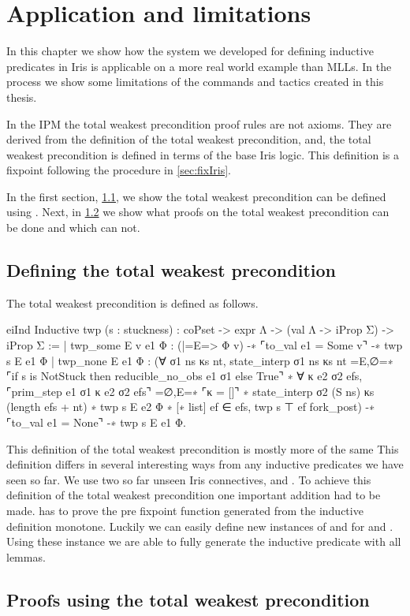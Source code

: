 \documentclass[thesis.tex]{subfiles}
\begin{document}
\VerbatimFootnotes

\chapter{Application and limitations}\label{ch:application}
In this chapter we show how the system we developed for defining inductive predicates in Iris is applicable on a more real world example than MLLs. In the process we show some limitations of the commands and tactics created in this thesis.

In the IPM the total weakest precondition proof rules are not axioms. They are derived from the definition of the total weakest precondition, and, the total weakest precondition is defined in terms of the base Iris logic. This definition is a fixpoint following the procedure in \cref{sec:fixIris}.

In the first section, \cref{sec:deftwp}, we show the total weakest precondition can be defined using . Next, in \cref{sec:prooftwp} we show what proofs on the total weakest precondition can be done and which can not.

\section{Defining the total weakest precondition}\label{sec:deftwp}
The total weakest precondition is defined as follows.
\begin{coqcode}
  eiInd
  Inductive twp (s : stuckness) : 
      coPset -> expr Λ -> 
      (val Λ -> iProp Σ) -> iProp Σ :=
    | twp_some E v e1 Φ : 
      (|={E}=> Φ v) -∗ 
      ⌜to_val e1 = Some v⌝ -∗ 
      twp s E e1 Φ
    | twp_none E e1 Φ : 
      (∀ σ1 ns κs nt,
         state_interp σ1 ns κs nt ={E,∅}=∗
         ⌜if s is NotStuck then reducible_no_obs e1 σ1 
                           else True⌝ ∗
         ∀ κ e2 σ2 efs, 
           ⌜prim_step e1 σ1 κ e2 σ2 efs⌝ ={∅,E}=∗
           ⌜κ = []⌝ ∗
           state_interp σ2 (S ns) κs (length efs + nt) ∗
           twp s E e2 Φ ∗
           [∗ list] ef ∈ efs, twp s ⊤ ef fork_post) 
      -∗ ⌜to_val e1 = None⌝ 
      -∗ twp s E e1 Φ.
\end{coqcode}
This definition of the total weakest precondition is mostly more of the same
This definition differs in several interesting ways from any inductive predicates we have seen so far. We use two so far unseen Iris connectives,  and \coqi{[_ list]}.
To achieve this definition of the total weakest precondition one important addition had to be made.  has to prove the pre fixpoint function generated from the inductive definition monotone. Luckily we can easily define new instances of  and  for  and \coqi{[_ list]}. Using these instance we are able to fully generate the inductive predicate with all lemmas.

\section{Proofs using the total weakest precondition}\label{sec:prooftwp}
\end{document}
